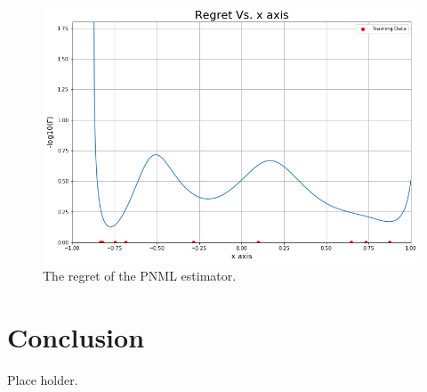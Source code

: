 \documentclass[final,1p,times]{elsarticle}
\begin{document}
\begin{figure}[h]
\centering\includegraphics[width=0.6\linewidth]{regret_plot.png}
\caption{The regret of the PNML estimator.}
\label{fig:regret}
\end{figure}

\section{Conclusion} \label{sec:Conclusion}
Place holder.





\end{document}
